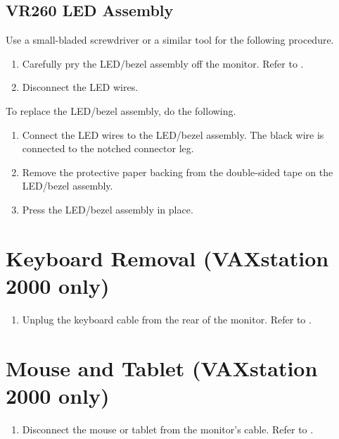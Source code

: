 \newpage

\newpage

\subsection{VR260 LED Assembly}

Use a small-bladed screwdriver or a similar tool for the following procedure.

\begin{enumerate}

\item	Carefully pry the LED/bezel assembly off the monitor. Refer to .


\item	Disconnect the LED wires.
\end{enumerate}

To replace the LED/bezel assembly, do the following.

\begin{enumerate}
\item	Connect the LED wires to the LED/bezel assembly. The black wire is
		connected to the notched connector leg.

\item	Remove the protective paper backing from the double-sided tape on
		the LED/bezel assembly.

\item	Press the LED/bezel assembly in place.
\end{enumerate}
\newpage


\section{Keyboard Removal (VAXstation 2000 only)}
\begin{enumerate}
\item	Unplug the keyboard cable from the rear of the monitor. Refer to .
\end{enumerate}
\newpage

\section{Mouse and Tablet (VAXstation 2000 only)}
\begin{enumerate}
\item	Disconnect the mouse or tablet from the monitor's cable. Refer to .
\end{enumerate}
\newpage



